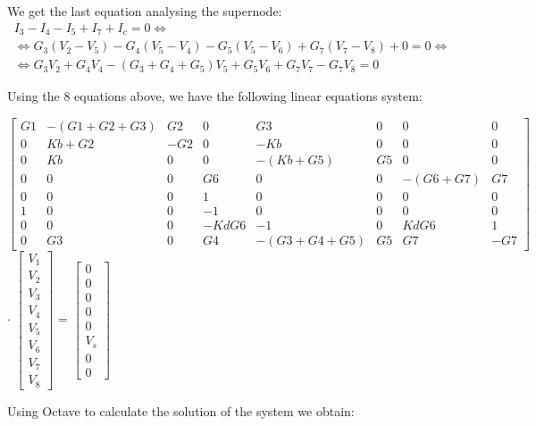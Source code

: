 We get the last equation analysing the supernode:
\begin{gather}
    I_3-I_4-I_5+I_7+I_c=0 \iff \nonumber \\
    \iff G_3(V_2-V_5)-G_4(V_5-V_4)-G_5(V_5-V_6)+G_7(V_7-V_8)+0=0 \iff \\
    \iff G_3V_2+G_4V_4-(G_3+G_4+G_5)V_5+G_5V_6+G_7V_7-G_7V_8=0 \nonumber
\end{gather}

Using the 8 equations above, we have the following linear equations system:
\vspace{10pt}

\fontsize{8}{12}\selectfont
$\begin{bmatrix}
    G1 & -(G1+G2+G3) & G2 & 0 & G3 & 0 & 0 & 0 \\
    0 & Kb+G2 & -G2 & 0 & -Kb & 0 & 0 & 0 \\
    0 & Kb & 0 & 0 & -(Kb+G5) & G5 & 0 & 0 \\
    0 & 0 & 0 & G6 & 0 & 0 & -(G6+G7) & G7 \\
    0 & 0 & 0 & 1 & 0 & 0 & 0 & 0 \\
    1 & 0 & 0 & -1 & 0 & 0 & 0 & 0 \\
    0 & 0 & 0 & -KdG6 & -1 & 0 & KdG6 & 1 \\
    0 & G3 & 0 & G4 & -(G3+G4+G5) & G5 & G7 & -G7
\end{bmatrix}$ $\cdot$
$\begin{bmatrix}
     V_1 \\V_2 \\V_3 \\V_4 \\V_5 \\V_6 \\V_7 \\V_8
\end{bmatrix}$ =
$\begin{bmatrix}
    0 \\0 \\0 \\0 \\0 \\V_s \\0 \\0 
\end{bmatrix}$

\fontsize{11}{12}\selectfont
\vspace{20pt}
Using Octave to calculate the solution of the system we obtain:

